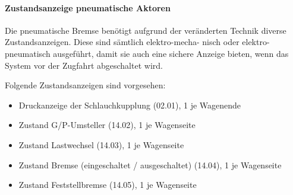 \paragraph{Zustandsanzeige pneumatische Aktoren}\label{sec:ZustandKupplung}
Die pneumatische Bremse benötigt aufgrund der veränderten Technik diverse Zustandsanzeigen. Diese sind sämtlich elektro-mecha- nisch oder elektro-pneumatisch ausgeführt, damit sie auch eine sichere Anzeige bieten, wenn das System vor der \gls{Zugfahrt} abgeschaltet wird.\par
Folgende Zustandsanzeigen sind vorgesehen:
\begin{itemize}
    \item Druckanzeige der Schlauchkupplung (02.01), 1 je Wagenende
    \item Zustand G/P-Umsteller (14.02), 1 je Wagenseite
    \item Zustand \gls{Lastwechsel} (14.03), 1 je Wagenseite
    \item Zustand Bremse (eingeschaltet / ausgeschaltet) (14.04), 1 je Wagenseite
    \item Zustand Feststellbremse (14.05), 1 je Wagenseite
\end{itemize}
